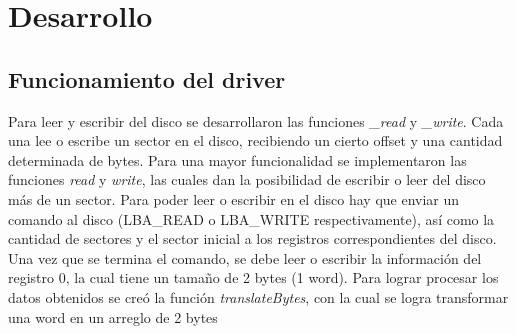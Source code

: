\documentclass[a4paper,10pt]{article}
\begin{document}
\newpage


\section{Desarrollo}

\subsection{Funcionamiento del driver}
Para leer y escribir del disco se desarrollaron las funciones \emph{_read} y \emph{_write}. Cada 
una lee o escribe un sector en el disco, recibiendo un cierto offset y una cantidad determinada de bytes. 
Para una mayor funcionalidad se implementaron las funciones \emph{read} y \emph{write},
las cuales dan la posibilidad de escribir o leer del disco más de un sector.
Para poder leer o escribir en el disco hay que enviar un comando al disco (LBA_READ o LBA_WRITE respectivamente), 
así como la cantidad de sectores y el sector inicial a los registros correspondientes del disco.
Una vez que se termina el comando, se debe leer o escribir la información del registro 0, la cual
tiene un tamaño de 2 bytes (1 word). Para lograr procesar los datos obtenidos se creó la función \emph{translateBytes}, 
con la cual se logra transformar una word en un arreglo de 2 bytes
\end{document}
